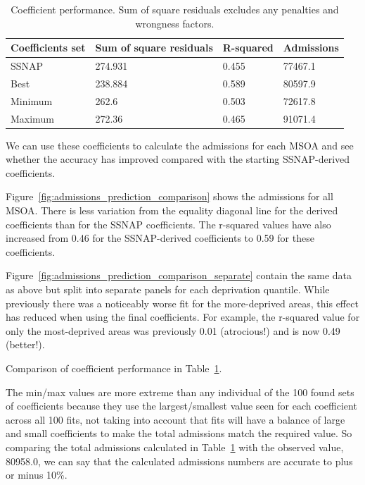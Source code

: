 \documentclass[12pt]{extarticle}
\begin{document}
\begin{table}
\centering
\caption{Coefficient performance. Sum of square residuals excludes any penalties and wrongness factors.}
\begin{tabular}{llll}
Coefficients set & Sum of square residuals & R-squared & Admissions \\
\hline
SSNAP & 274.931 & 0.455 & 77467.1 \\
Best & 238.884 & 0.589 & 80597.9 \\
Minimum & 262.6 & 0.503 & 72617.8 \\
Maximum & 272.36 & 0.465 & 91071.4 \\
\end{tabular}
\label{tab:coeff_performance}
\end{table}


We can use these coefficients to calculate the admissions for each MSOA and see whether the accuracy has improved compared with the starting SSNAP-derived coefficients.

Figure~\ref{fig:admissions_prediction_comparison} shows the admissions for all MSOA.
There is less variation from the equality diagonal line for the derived coefficients than for the SSNAP coefficients. The r-squared values have also increased from 0.46 for the SSNAP-derived coefficients to 0.59 for these coefficients.

Figure~\ref{fig:admissions_prediction_comparison_separate} contain the same data as above but split into separate panels for each deprivation quantile.
While previously there was a noticeably worse fit for the more-deprived areas, this effect has reduced when using the final coefficients. For example, the r-squared value for only the most-deprived areas was previously 0.01 (atrocious!) and is now 0.49 (better!).

Comparison of coefficient performance in Table~\ref{tab:coeff_performance}.

The min/max values are more extreme than any individual of the 100 found sets of coefficients because they use the largest/smallest value seen for each coefficient across all 100 fits, not taking into account that fits will have a balance of large and small coefficients to make the total admissions match the required value.
So comparing the total admissions calculated in Table~\ref{tab:coeff_performance} with the observed value, 80958.0, we can say that the calculated admissions numbers are accurate to plus or minus 10\%.
\end{document}
